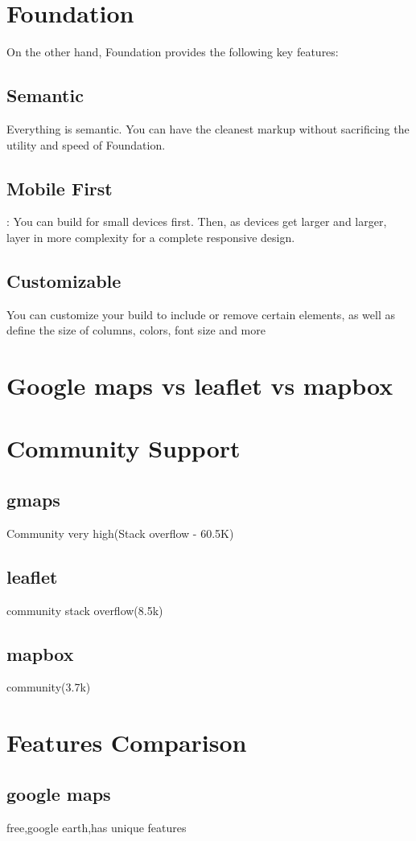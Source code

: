 \documentclass{article}
\begin{document}
\section{Foundation}
On the other hand, Foundation provides the following key features:

\subsection{Semantic}Everything is semantic. You can have the cleanest markup without sacrificing the utility and speed of Foundation.
\subsection{Mobile First}: You can build for small devices first. Then, as devices get larger and larger, layer in more complexity for a complete responsive design.
\subsection{Customizable}You can customize your build to include or remove certain elements, as well as define the size of columns, colors, font size and more

\section{Google maps vs leaflet vs mapbox}
\section{Community Support}
\subsection{gmaps}Community very high(Stack overflow - 60.5K)
\subsection{leaflet}community stack overflow(8.5k)
\subsection{mapbox}community(3.7k)

\section{Features Comparison}
\subsection{google maps}free,google earth,has unique features
\end{document}
